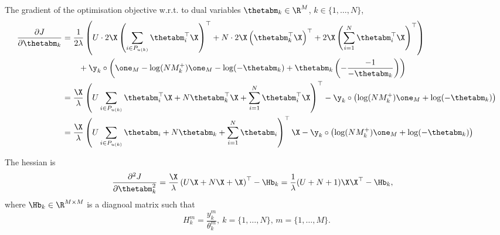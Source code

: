 The gradient of the optimisation objective w.r.t. to dual variables $\thetabm_k \in \R^{M}$, $k \in \{1,\dots,N\}$,
\begin{equation*}
\begin{aligned}
\frac{\partial J}{\partial \thetabm_k}
&= \frac{1}{2 \lambda} \left( U \cdot 2 \X \left(\sum_{i \in P_{u(k)}} \thetabm_i^\top \X \right)^\top 
   + N \cdot 2 \X \left( \thetabm_k^\top \X \right)^\top
   + 2 \X \left(\sum_{i=1}^N \thetabm_i^\top \X \right)^\top \right) \\
& \hspace{2em}
   + \y_k \circ \left( \one_M - \log(N M_k^+) \one_M - \log(-\thetabm_k) + \thetabm_k \left( -\frac{-1}{-\thetabm_k} \right) \right) \\
&= \frac{\X}{\lambda} \left( U \sum_{i \in P_{u(k)}} \thetabm_i^\top \X 
   + N \thetabm_k^\top \X 
   + \sum_{i=1}^N \thetabm_i^\top \X \right)^\top
   - \y_k \circ \left( \log(N M_k^+) \one_M + \log(-\thetabm_k) \right) \\
&= \frac{\X}{\lambda} \left( U \sum_{i \in P_{u(k)}} \thetabm_i + N \thetabm_k + \sum_{i=1}^N \thetabm_i \right)^\top \X
   - \y_k \circ \left( \log(N M_k^+) \one_M + \log(-\thetabm_k) \right) \\
\end{aligned}
\end{equation*}

The hessian is
\begin{equation*}
\begin{aligned}
\frac{\partial^2 J}{\partial \thetabm_k^2}
&= \frac{\X}{\lambda} \left( U \X + N \X + \X \right)^\top - \Hb_k
 = \frac{1}{\lambda} (U + N + 1) \X \X^\top - \Hb_k,
\end{aligned}
\end{equation*}
where $\Hb_k \in \R^{M \times M}$ is a diagnoal matrix such that
\begin{equation*}
H_k^m = \frac{y_k^m}{\theta_k^m}, \ k = \{1,\dots,N\}, \, m = \{1,\dots,M\}.
\end{equation*}
